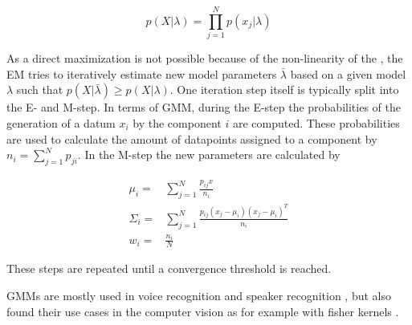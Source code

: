 \begin{equation}
\label{eqn:likelihood}
p(X|\lambda) = \prod_{j=1}^{N} p(x_j|\lambda)
\end{equation}

As a direct maximization is not possible because of the non-linearity of the , the \ac{EM} tries to iteratively estimate new model parameters $\bar{\lambda}$ based on a given model $\lambda$ such that $p(X|\bar{\lambda}) \ge p(X|\lambda)$. One iteration step itself is typically split into the E- and M-step. In terms of \ac{GMM}, during the E-step the probabilities of the generation of a datum $x_i$ by the component $i$ are computed. These probabilities are used to calculate the amount of datapoints assigned to a component by $n_i = \sum_{j=1}^N p_{ji}$. In the M-step the new parameters are calculated by

\begin{eqnarray}
\mu_i = &\sum_{j=1}^N \frac{p_{ij} x}{n_i} \\
\Sigma_i = & \sum_{j=1}^N \frac{p_{ij} (x_j - \mu_i) (x_j - \mu_i)^T}{n_i}\\
w_i  = & \frac{n_i}{N}
\end{eqnarray}

These steps are repeated until a convergence threshold is reached.

\acp{GMM} are mostly used in voice recognition and speaker recognition \cite{Reynolds1995}, but also found their use cases in the computer vision as for example with fisher kernels \cite{Perronnin2006}.